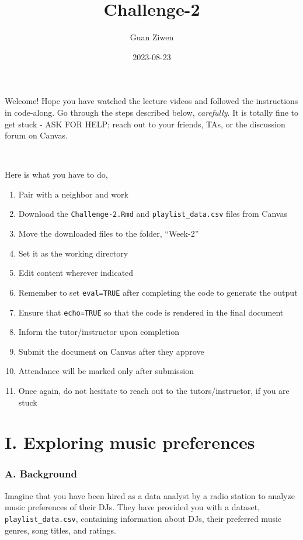\documentclass[
]{article}
\title{Challenge-2}
\author{Guan Ziwen}
\date{2023-08-23}
\begin{document}
\maketitle

Welcome! Hope you have watched the lecture videos and followed the
instructions in code-along. Go through the steps described below,
\emph{carefully}. It is totally fine to get stuck - ASK FOR HELP; reach
out to your friends, TAs, or the discussion forum on Canvas.

~

Here is what you have to do,

\begin{enumerate}
\def\labelenumi{\arabic{enumi}.}
\item
  Pair with a neighbor and work
\item
  Download the \texttt{Challenge-2.Rmd} and \texttt{playlist\_data.csv}
  files from Canvas
\item
  Move the downloaded files to the folder, ``Week-2''
\item
  Set it as the working directory
\item
  Edit content wherever indicated
\item
  Remember to set \texttt{eval=TRUE} after completing the code to
  generate the output
\item
  Ensure that \texttt{echo=TRUE} so that the code is rendered in the
  final document
\item
  Inform the tutor/instructor upon completion
\item
  Submit the document on Canvas after they approve
\item
  Attendance will be marked only after submission
\item
  Once again, do not hesitate to reach out to the tutors/instructor, if
  you are stuck
\end{enumerate}

\hypertarget{i.-exploring-music-preferences}{%
\section{I. Exploring music
preferences}\label{i.-exploring-music-preferences}}

\hypertarget{a.-background}{%
\subsubsection{A. Background}\label{a.-background}}

Imagine that you have been hired as a data analyst by a radio station to
analyze music preferences of their DJs. They have provided you with a
dataset, \texttt{playlist\_data.csv}, containing information about DJs,
their preferred music genres, song titles, and ratings.
\end{document}

